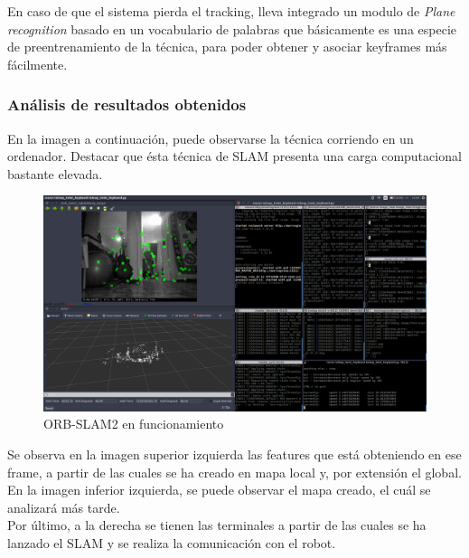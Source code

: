En caso de que el sistema pierda el tracking, lleva integrado un modulo de \textit{Plane recognition} basado en un vocabulario 
de palabras que básicamente es una especie de preentrenamiento de la técnica, para poder obtener y asociar keyframes más fácilmente. \\

\subsubsection{Análisis de resultados obtenidos}
En la imagen a continuación, puede observarse la técnica corriendo en un ordenador. Destacar que ésta técnica de SLAM presenta una carga computacional bastante elevada.
\begin{figure}[h!]
    \centering
    \includegraphics[width=1\textwidth]{images/working_zone_orb}
    \caption{ORB-SLAM2 en funcionamiento}
\end{figure}

Se observa en la imagen superior izquierda las features que está obteniendo en ese frame, a partir de las cuales se ha creado en mapa local y,
por extensión el global. En la imagen inferior izquierda, se puede observar el mapa creado, el cuál se analizará más tarde.\\
Por último, a la derecha se tienen las terminales a partir de las cuales se ha lanzado el SLAM y se realiza la comunicación con el robot.